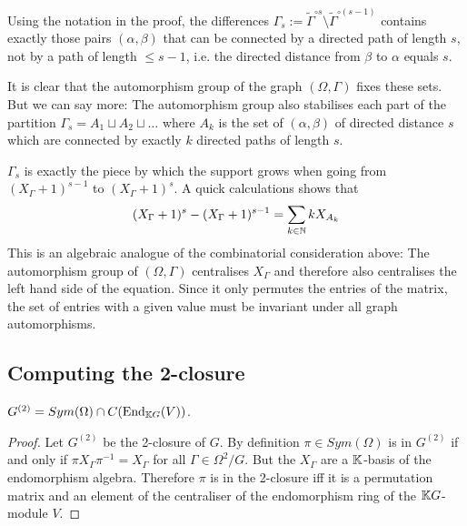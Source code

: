 \documentclass[fontsize=11pt,fleqn,a4paper]{scrartcl}
\begin{document}
\begin{remark}
Using the notation in the proof, the differences $\Gamma_s:=\widetilde{\Gamma}^{\circ s} \setminus \widetilde{\Gamma}^{\circ(s-1)}$ contains exactly those pairs $(\alpha,\beta)$ that can be connected by a directed path of length $s$, not by a path of length $\leq s-1$, i.e. the directed distance from $\beta$ to $\alpha$ equals $s$.

It is clear that the automorphism group of the graph $(\Omega,\Gamma)$ fixes these sets. But we can say more: The automorphism group also stabilises each part of the partition $\Gamma_s = A_1 \sqcup A_2 \sqcup \ldots$ where $A_k$ is the set of $(\alpha,\beta)$ of directed distance $s$ which are connected by exactly $k$ directed paths of length $s$.

$\Gamma_s$ is exactly the piece by which the support grows when going from $(X_\Gamma+1)^{s-1}$ to $(X_\Gamma+1)^s$. A quick calculations shows that \[(X_\Gamma+1)^s - (X_\Gamma+1)^{s-1} = \sum_{k\in\mathbb{N}} k X_{A_k}\]
This is an algebraic analogue of the combinatorial consideration above: The automorphism group of $(\Omega,\Gamma)$ centralises $X_\Gamma$ and therefore also centralises the left hand side of the equation. Since it only permutes the entries of the matrix, the set of entries with a given value must be invariant under all graph automorphisms.
\end{remark}

\subsection{Computing the 2-closure}

\begin{theorem}\label{two_closure:in_terms_of_endomorphisms}
$G^{(2)} = Sym(\Omega)\cap C(\operatorname{End}_{\mathbb{K} G}(V))$.
\end{theorem}
\begin{proof}
Let $G^{(2)}$ be the 2-closure of $G$. By definition $\pi\in Sym(\Omega)$ is in $G^{(2)}$ if and only if $\pi X_\Gamma \pi^{-1} = X_\Gamma$ for all $\Gamma\in\Omega^2/G$. But the $X_\Gamma$ are a $\mathbb{K}$-basis of the endomorphism algebra. Therefore $\pi$ is in the 2-closure iff it is a permutation matrix and an element of the centraliser of the endomorphism ring of the $\mathbb{K} G$-module $V$.
\end{proof}
\end{document}
